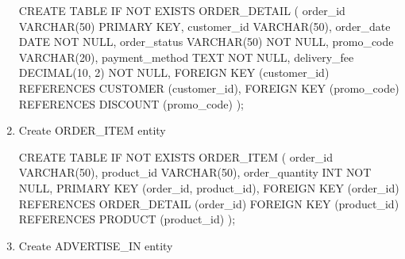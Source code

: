 \documentclass[
  letterpaper,
  DIV=11,
  numbers=noendperiod]{scrartcl}
\newenvironment{Shaded}{\begin{snugshade}}{\end{snugshade}}
\newcommand{\ControlFlowTok}[1]{\textcolor[rgb]{0.00,0.23,0.31}{#1}}
\newcommand{\DataTypeTok}[1]{\textcolor[rgb]{0.68,0.00,0.00}{#1}}
\newcommand{\DecValTok}[1]{\textcolor[rgb]{0.68,0.00,0.00}{#1}}
\newcommand{\KeywordTok}[1]{\textcolor[rgb]{0.00,0.23,0.31}{#1}}
\newcommand{\NormalTok}[1]{\textcolor[rgb]{0.00,0.23,0.31}{#1}}
\begin{document}
\begin{enumerate}
\begin{Shaded}
\begin{Highlighting}[]
\KeywordTok{CREATE} \KeywordTok{TABLE} \ControlFlowTok{IF} \KeywordTok{NOT} \KeywordTok{EXISTS}\NormalTok{ ORDER\_DETAIL (}
\NormalTok{  order\_id }\DataTypeTok{VARCHAR}\NormalTok{(}\DecValTok{50}\NormalTok{) }\KeywordTok{PRIMARY} \KeywordTok{KEY}\NormalTok{,}
\NormalTok{  customer\_id }\DataTypeTok{VARCHAR}\NormalTok{(}\DecValTok{50}\NormalTok{), }
\NormalTok{  order\_date }\DataTypeTok{DATE} \KeywordTok{NOT} \KeywordTok{NULL}\NormalTok{,}
\NormalTok{  order\_status }\DataTypeTok{VARCHAR}\NormalTok{(}\DecValTok{50}\NormalTok{) }\KeywordTok{NOT} \KeywordTok{NULL}\NormalTok{, }
\NormalTok{  promo\_code }\DataTypeTok{VARCHAR}\NormalTok{(}\DecValTok{20}\NormalTok{),}
\NormalTok{  payment\_method TEXT }\KeywordTok{NOT} \KeywordTok{NULL}\NormalTok{,}
\NormalTok{  delivery\_fee }\DataTypeTok{DECIMAL}\NormalTok{(}\DecValTok{10}\NormalTok{, }\DecValTok{2}\NormalTok{) }\KeywordTok{NOT} \KeywordTok{NULL}\NormalTok{,}
  \KeywordTok{FOREIGN} \KeywordTok{KEY}\NormalTok{ (customer\_id) }\KeywordTok{REFERENCES}\NormalTok{ CUSTOMER (customer\_id),}
  \KeywordTok{FOREIGN} \KeywordTok{KEY}\NormalTok{ (promo\_code)  }\KeywordTok{REFERENCES}\NormalTok{ DISCOUNT (promo\_code)}
\NormalTok{);}
\end{Highlighting}
\end{Shaded}
\item
  Create ORDER\_ITEM entity

\begin{Shaded}
\begin{Highlighting}[]
\KeywordTok{CREATE} \KeywordTok{TABLE} \ControlFlowTok{IF} \KeywordTok{NOT} \KeywordTok{EXISTS}\NormalTok{ ORDER\_ITEM (}
\NormalTok{  order\_id }\DataTypeTok{VARCHAR}\NormalTok{(}\DecValTok{50}\NormalTok{),}
\NormalTok{  product\_id }\DataTypeTok{VARCHAR}\NormalTok{(}\DecValTok{50}\NormalTok{),}
\NormalTok{  order\_quantity }\DataTypeTok{INT} \KeywordTok{NOT} \KeywordTok{NULL}\NormalTok{,}
  \KeywordTok{PRIMARY} \KeywordTok{KEY}\NormalTok{ (order\_id, product\_id),}
  \KeywordTok{FOREIGN} \KeywordTok{KEY}\NormalTok{ (order\_id)   }\KeywordTok{REFERENCES}\NormalTok{ ORDER\_DETAIL (order\_id)}
  \KeywordTok{FOREIGN} \KeywordTok{KEY}\NormalTok{ (product\_id) }\KeywordTok{REFERENCES}\NormalTok{ PRODUCT (product\_id)}
\NormalTok{);}
\end{Highlighting}
\end{Shaded}
\item
  Create ADVERTISE\_IN entity


\end{enumerate}
\end{document}
